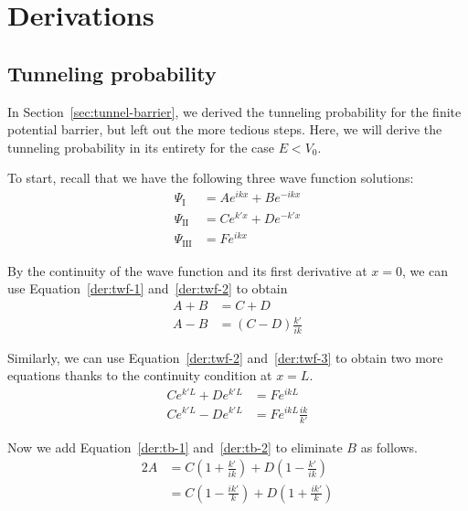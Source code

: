 %

%

\chapter{Derivations} \label{ch:deriv}
\section{Tunneling probability}  \label{sec:tunnel-deriv}
In Section~\ref{sec:tunnel-barrier}, we derived the tunneling probability for the finite potential barrier, but left out the more tedious steps. Here, we will derive the tunneling probability in its entirety for the case $E < V_0$. \par 

To start, recall that we have the following three wave function solutions:
\begin{align}
\Psi_{\text{I}} &= Ae^{ikx} + Be^{-ikx} \label{der:twf-1} \\
\Psi_{\text{II}} &= Ce^{k'x} + De^{-k'x} \label{der:twf-2} \\
\Psi_{\text{III}} &= Fe^{ikx} \label{der:twf-3}
\end{align}

By the continuity of the wave function and its first derivative at $x=0$, we can use Equation~\ref{der:twf-1} and~\ref{der:twf-2} to obtain
\begin{align}
	A + B &= C + D \label{der:tb-1} \\
	A - B &= (C - D)\frac{k'}{ik} \label{der:tb-2}
\end{align}

Similarly, we can use Equation~\ref{der:twf-2} and~\ref{der:twf-3} to obtain two more equations thanks to the continuity condition at $x=L$.
\begin{align}
	Ce^{k'L} + De^{k'L} &= Fe^{ikL} \label{der:tb-3} \\
	Ce^{k'L} - De^{k'L} &= Fe^{ikL}\frac{ik}{k'} \label{der:tb-4}
\end{align}

Now we add Equation~\ref{der:tb-1} and~\ref{der:tb-2} to eliminate $B$ as follows.
\begin{align}
	2A &= C \left(1 + \frac{k'}{ik}\right) + D\left(1 - \frac{k'}{ik}\right) \nonumber \\ 
	&= C \left(1 - \frac{ik'}{k}\right) + D\left(1 + \frac{ik'}{k}\right) \label{der:ta}
\end{align}

